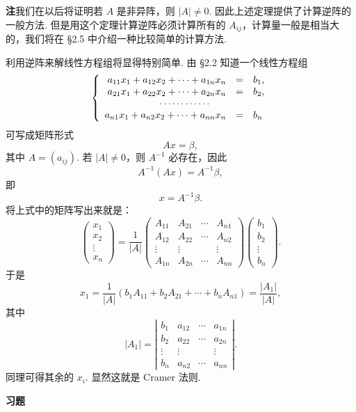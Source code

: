\documentclass[UTF8,12pt,a4paper,fontset=fandol]{ctexart}
\begin{document}
\noindent\textbf{注}\quad 我们在以后将证明若 $A$ 是非异阵，则 $|A|\ne 0$. 因此上述定理提供了计算逆阵的一般方法. 但是用这个定理计算逆阵必须计算所有的 $A_{ij}$，计算量一般是相当大的，我们将在 §2.5 中介绍一种比较简单的计算方法.

利用逆阵来解线性方程组将显得特别简单. 由 §2.2 知道一个线性方程组
\[
\left\{\begin{array}{rcl}
a_{11}x_1+a_{12}x_2+\cdots+a_{1n}x_n&=&b_1,\\
a_{21}x_1+a_{22}x_2+\cdots+a_{2n}x_n&=&b_2,\\
\multicolumn{3}{c}{\cdots\cdots\cdots\cdots}\\
a_{n1}x_1+a_{n2}x_2+\cdots+a_{nn}x_n&=&b_n
\end{array}\right.
\]
可写成矩阵形式
\[
Ax=\beta,
\]
其中 $A=(a_{ij})$. 若 $|A|\ne 0$，则 $A^{-1}$ 必存在，因此
\[
A^{-1}(Ax)=A^{-1}\beta,
\]
即
\[
x=A^{-1}\beta.
\]
将上式中的矩阵写出来就是：
\[
\left(\begin{array}{c}
x_1\\
x_2\\
\vdots\\
x_n
\end{array}\right)
=\frac{1}{|A|}
\left(\begin{array}{cccc}
A_{11} & A_{21} & \cdots & A_{n1}\\
A_{12} & A_{22} & \cdots & A_{n2}\\
\vdots & \vdots & & \vdots\\
A_{1n} & A_{2n} & \cdots & A_{nn}
\end{array}\right)
\left(\begin{array}{c}
b_1\\
b_2\\
\vdots\\
b_n
\end{array}\right).
\]
于是
\[
x_1=\frac{1}{|A|}(b_1A_{11}+b_2A_{21}+\cdots+b_nA_{n1})=\frac{|A_1|}{|A|},
\]
其中
\[
|A_1|=\left|\begin{array}{cccc}
b_1 & a_{12} & \cdots & a_{1n}\\
b_2 & a_{22} & \cdots & a_{2n}\\
\vdots & \vdots & & \vdots\\
b_n & a_{n2} & \cdots & a_{nn}
\end{array}\right|.
\]
同理可得其余的 $x_i$. 显然这就是 Cramer 法则.

\begin{center}
\textbf{习\quad 题}
\end{center}
\end{document}

